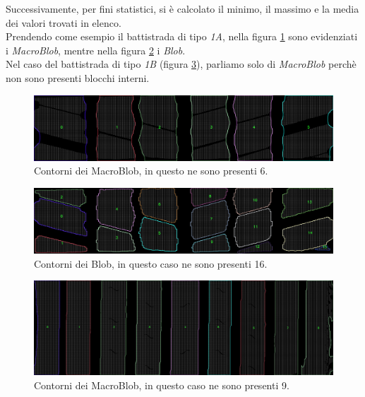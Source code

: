 \noindent Successivamente, per fini statistici, si è calcolato il minimo, il massimo e la media dei valori trovati in elenco.\\
\newline
Prendendo come esempio il battistrada di tipo \textit{1A}, nella figura \ref{fig:batt_1a_analisi_mb} sono evidenziati i \textit{MacroBlob}, mentre nella figura \ref{fig:batt_1a_analisi_b} i \textit{Blob}.\\
Nel caso del battistrada di tipo \textit{1B} (figura \ref{fig:batt_1b_analisi_mb}), parliamo solo di \textit{MacroBlob} perchè non sono presenti blocchi interni.\\

\begin{figure}[H]
	\centering
	\includegraphics[width=0.9\columnwidth]{./pictures/batt_1a_analisi_mb.png}
	\caption{Contorni dei MacroBlob, in questo ne sono presenti 6.}\label{fig:batt_1a_analisi_mb}
\end{figure}

\begin{figure}[H]
	\centering
	\includegraphics[width=0.9\columnwidth]{./pictures/batt_1a_analisi_b.png}
	\caption{Contorni dei Blob, in questo caso ne sono presenti 16.}\label{fig:batt_1a_analisi_b}
\end{figure}

\begin{figure}[H]
	\centering
	\includegraphics[width=0.9\columnwidth]{./pictures/batt_1b_analisi_mb.png}
	\caption{Contorni dei MacroBlob, in questo caso ne sono presenti 9.}\label{fig:batt_1b_analisi_mb}
\end{figure}

